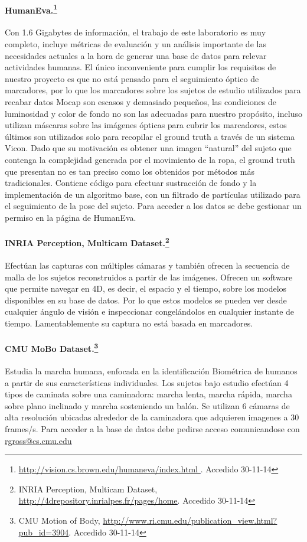 \paragraph{HumanEva.\footnote{\textcolor{blue}{\underline{\url{http://vision.cs.brown.edu/humaneva/index.html }}}. Accedido 30-11-14} \cite{humaneva} }
Con 1.6 Gigabytes de información, el trabajo de este laboratorio es muy completo, incluye métricas de evaluación y un análisis importante de las necesidades actuales a la hora de generar una base de datos para relevar actividades humanas. El único inconveniente para cumplir los requisitos de nuestro proyecto es que no está pensado para el seguimiento óptico de marcadores, por lo que los marcadores sobre los sujetos de estudio utilizados para recabar datos Mocap son escasos y demasiado pequeños, las condiciones de luminosidad y color de fondo no son las adecuadas para nuestro propósito, incluso utilizan máscaras sobre las imágenes ópticas para cubrir los marcadores, estos últimos son utilizados solo para recopilar el ground truth a través de un sistema Vicon.  Dado que su motivación es obtener una imagen ``natural'' del sujeto que contenga la complejidad generada por el movimiento de la ropa, el ground truth que presentan  no es tan preciso como los obtenidos por métodos más tradicionales.  Contiene código para efectuar sustracción de fondo y la implementación de un algoritmo base, con un filtrado de partículas utilizado para el seguimiento de la pose del sujeto. Para acceder a los datos se debe gestionar un permiso en la página de HumanEva. 

\paragraph{INRIA Perception, Multicam Dataset.\footnote{INRIA Perception, Multicam Dataset, \textcolor{blue}{\underline{\url{http://4drepository.inrialpes.fr/pages/home}}}. Accedido 30-11-14}} Efectúan las capturas con múltiples cámaras y también ofrecen la secuencia de malla de los sujetos reconstruidos a partir de las imágenes. Ofrecen un software que permite navegar en 4D, es decir, el espacio y el tiempo, sobre los modelos disponibles en su base de datos. Por lo que estos modelos se pueden ver desde cualquier ángulo de visión e inspeccionar congelándolos en cualquier instante de tiempo. Lamentablemente su captura no está basada en marcadores. 

\paragraph{CMU MoBo Dataset.\footnote{CMU Motion of Body,  \textcolor{blue}{\underline{\url{http://www.ri.cmu.edu/publication_view.html?pub_id=3904}}}. Accedido 30-11-14}}
Estudia la marcha humana, enfocada en la identificación Biométrica de humanos a partir de sus características individuales. Los sujetos bajo estudio efectúan 4 tipos de caminata sobre una caminadora: marcha lenta, marcha rápida, marcha sobre plano inclinado y marcha sosteniendo un balón. Se utilizan 6 cámaras de alta resolución ubicadas alrededor de la caminadora que adquieren imagenes a 30 frames/s. Para acceder a la base de datos debe pedirse acceso comunicandose con \textcolor{blue}{\underline{\url{rgross@cs.cmu.edu }}}

